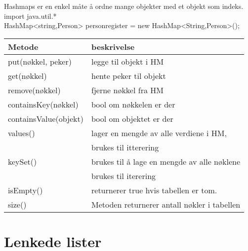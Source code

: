 \documentclass[11pt]{article}
\begin{document}
  Hashmaps er en enkel måte å ordne mange objekter med et objekt som
  indeks.\\
  import java.util.*\\
  HashMap<string,Person> personregister = new HashMap<String,Person>();\\
  

\begin{center}
\begin{tabular}{ll}
\hline
 Metode                 &  beskrivelse                                  \\
\hline
 put(nøkkel, peker)     &  legge til objekt i HM                        \\
\hline
 get(nøkkel)            &  hente peker til objekt                       \\
\hline
 remove(nøkkel)         &  fjerne nøkkel fra HM                         \\
\hline
 containsKey(nøkkel)    &  bool om nøkkelen er der                      \\
\hline
 containsValue(objekt)  &  bool om objektet er der                      \\
\hline
 values()               &  lager en mengde av alle verdiene i HM,       \\
                        &  brukes til itterering                        \\
\hline
 keySet()               &  brukes til å lage en mengde av alle nøklene  \\
                        &  brukes til iterering                         \\
\hline
 isEmpty()              &  returnerer true hvis tabellen er tom.        \\
\hline
 size()                 &  Metoden returnerer antall nøkler i tabellen  \\
\hline
\end{tabular}
\end{center}


  
  
\section{Lenkede lister}
\label{sec-7}
\end{document}
